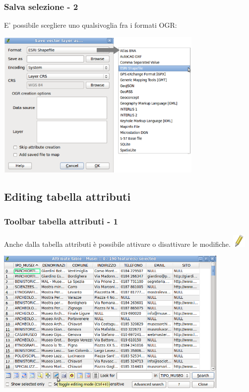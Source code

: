\documentclass{beamer}
\begin{document}
{ \begin{frame}
   \frametitle{Salva selezione - 2}
   E' possibile scegliere uno qualsivoglia fra i formati OGR: 
		    \begin{center}
			\includegraphics[width=0.75\textwidth] {topology_attrmanagement_pics/save.png}
		    \end{center}
\end{frame}


\subsection{Editing tabella attributi}
 \begin{frame}
       \frametitle{Toolbar tabella attributi - 1}
        Anche dalla tabella attributi è possibile attivare o disattivare le modifiche. \includegraphics[height=0.6 cm] {digitizing_pics/edit.png} 
              \begin{center}
		       \includegraphics[width=0.85\textwidth]{topology_attrmanagement_pics/toggle.png} 
	          \end{center}
 \end{frame}

}
\end{document}
